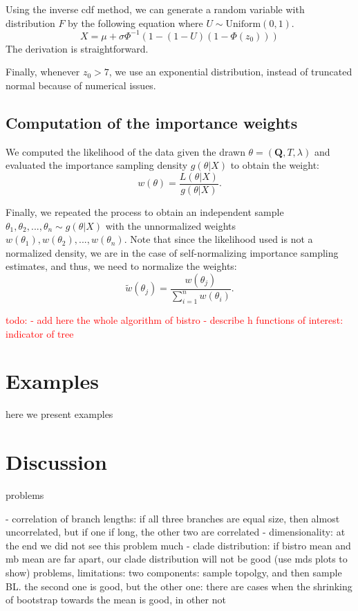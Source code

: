 \documentclass[useAMS,usenatbib]{biom}
\newcommand{\falta}[1]{\textcolor{red}{#1}}
\begin{document}
Using the inverse cdf method, we can generate a random variable with distribution $F$
by the following equation where $U \sim \text{Uniform}(0,1)$.
$$
X = \mu + \sigma \Phi^{-1}( 1 - (1-U)(1-\Phi(z_0)))
$$
The derivation is straightforward.

Finally, whenever $z_0>7$, we use an exponential distribution, instead
of truncated normal because of numerical issues.

\subsection{Computation of the importance weights}
We computed the likelihood of the data given the drawn $\theta = (\mathbf{Q}, T,
\lambda)$ and evaluated the importance sampling density $g(\theta|X)$
to obtain the weight:
\begin{equation}
w(\theta) = \frac{L(\theta|X)}{g(\theta|X)}.
\end{equation}

Finally, we repeated the process to obtain an independent sample
$\theta_1, \theta_2,...,\theta_n \sim g(\theta|X)$ with the
unnormalized weights $w(\theta_1), w(\theta_2),...,w(\theta_n)$. Note
that since the likelihood used is not a normalized density, we are in
the case of self-normalizing importance sampling estimates, and thus,
we need to normalize the weights:
\begin{equation}
\tilde{w}(\theta_j) = \frac{w(\theta_j)}{\sum_{i=1}^n w(\theta_i)}.
\end{equation}

\falta{todo:
- add here the whole algorithm of bistro
- describe h functions of interest: indicator of tree}


\section{Examples}
\label{examples}
here we present examples

\section{Discussion}
\label{discussion}
problems

- correlation of branch lengths: if all three branches are equal size,
then almost uncorrelated, but if one if long, the other two are correlated
- dimensionality: at the end we did not see this problem much
- clade distribution: if bistro mean and mb mean are far apart, our
clade distribution will not be good (use mds plots to show)
problems, limitations: two components: sample topolgy, and then
sample BL. the second one is good, but the other one: there are
cases when the shrinking of bootstrap towards the mean is good, in
other not
\end{document}
